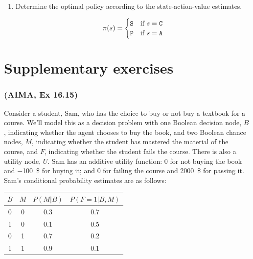 \documentclass[11pt, a4paper]{article}
\begin{document}
\begin{enumerate}
    \item Determine the optimal policy according to the state-action-value estimates.

    \begin{solution}
        \begin{equation*}
            \pi(s) = \begin{cases}
                \texttt{S} & \text{if } s = \texttt{C} \\
                \texttt{P} & \text{if } s = \texttt{A}
            \end{cases}
        \end{equation*}
    \end{solution}
\end{enumerate}

\newpage

\part*{Supplementary exercises}

\section{(AIMA, Ex 16.15)}

Consider a student, Sam, who has the choice to buy or not buy a textbook for a course. We'll model this as a decision problem with one Boolean decision node, $B$, indicating whether the agent chooses to buy the book, and two Boolean chance nodes,
$M$, indicating whether the student has mastered the material of the course, and $F$, indicating whether the student fails the course. There is also a utility node, $U$. Sam has an additive utility function: 0 for not buying the book and \qty{-100}{\$} for buying it; and 0 for failing the course and \qty{2000}{\$} for passing it. Sam's conditional probability estimates are as follows:

\begin{table}[h]
    \centering
    \begin{tabular}{cc|cc}
        \toprule
        $B$ & $M$ & $P(M | B)$ & $P(F = 1 | B, M)$ \\
        \midrule
        0 & 0 & 0.3 & 0.7 \\
        1 & 0 & 0.1 & 0.5 \\
        0 & 1 & 0.7 & 0.2 \\
        1 & 1 & 0.9 & 0.1 \\
        \bottomrule
    \end{tabular}
\end{table}
\end{document}
